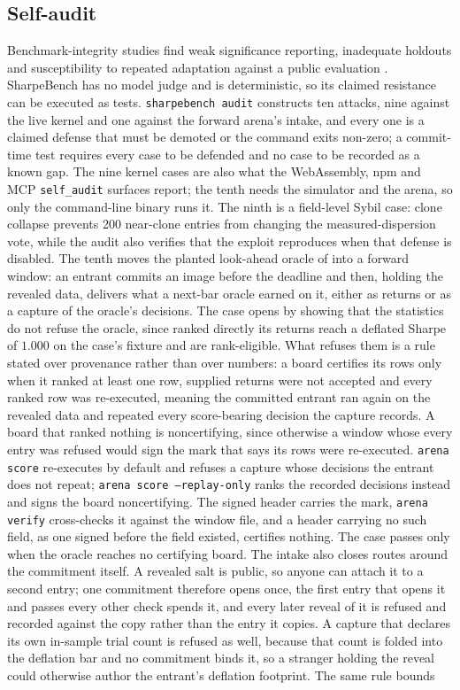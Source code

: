 \subsection{Self-audit}\label{sec:selfaudit} Benchmark-integrity studies find weak significance reporting, inadequate holdouts and susceptibility to repeated adaptation against a public evaluation \citep{betterbench2024,kapoor2024agents}. SharpeBench has no model judge and is deterministic, so its claimed resistance can be executed as tests. \texttt{sharpebench audit} constructs ten attacks, nine against the live kernel and one against the forward arena's intake, and every one is a claimed defense that must be demoted or the command exits non-zero; a commit-time test requires every case to be defended and no case to be recorded as a known gap. The nine kernel cases are also what the WebAssembly, npm and MCP \texttt{self\_audit} surfaces report; the tenth needs the simulator and the arena, so only the command-line binary runs it. The ninth is a field-level Sybil case: clone collapse prevents 200 near-clone entries from changing the measured-dispersion vote, while the audit also verifies that the exploit reproduces when that defense is disabled. The tenth moves the planted look-ahead oracle of \citet[p.~7]{gencay2026survives} into a forward window: an entrant commits an image before the deadline and then, holding the revealed data, delivers what a next-bar oracle earned on it, either as returns or as a capture of the oracle's decisions. The case opens by showing that the statistics do not refuse the oracle, since ranked directly its returns reach a deflated Sharpe of $1.000$ on the case's fixture and are rank-eligible. What refuses them is a rule stated over provenance rather than over numbers: a board certifies its rows only when it ranked at least one row, supplied returns were not accepted and every ranked row was re-executed, meaning the committed entrant ran again on the revealed data and repeated every score-bearing decision the capture records. A board that ranked nothing is noncertifying, since otherwise a window whose every entry was refused would sign the mark that says its rows were re-executed. \texttt{arena score} re-executes by default and refuses a capture whose decisions the entrant does not repeat; \texttt{arena score --replay-only} ranks the recorded decisions instead and signs the board noncertifying. The signed header carries the mark, \texttt{arena verify} cross-checks it against the window file, and a header carrying no such field, as one signed before the field existed, certifies nothing. The case passes only when the oracle reaches no certifying board. The intake also closes routes around the commitment itself. A revealed salt is public, so anyone can attach it to a second entry; one commitment therefore opens once, the first entry that opens it and passes every other check spends it, and every later reveal of it is refused and recorded against the copy rather than the entry it copies. A capture that declares its own in-sample trial count is refused as well, because that count is folded into the deflation bar and no commitment binds it, so a stranger holding the reveal could otherwise author the entrant's deflation footprint. The same rule bounds 